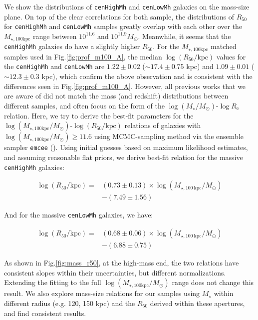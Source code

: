 \documentclass{emulateapj}
\def\rbcg{\texttt{cenHighMh}}
\def\nbcg{\texttt{cenLowMh}}
\def\mstar{{$M_{\star}$}}
\def\logms{{$\log (M_{\star}/M_{\odot})$}}
\def\mtot{{$M_{\star,100\mathrm{kpc}}$}}
\def\logmtot{{$\log (M_{\star,100\mathrm{kpc}}/M_{\odot})$}}
\begin{document}
\begin{CJK*}{UTF8}{gbsn}
    We show the distributions of \rbcg{} and \nbcg{} galaxies on the mass-size plane.  
    On top of the clear correlations for both sample, the distributions of $R_{\mathrm{50}}$ 
    for \rbcg{} and \nbcg{} samples greatly overlap with each other over the \mtot{} range
    between $10^{11.6}$ and $10^{11.9} M_{\odot}$. 
    Meanwhile, it seems that the \rbcg{} galaxies do have a slightly higher 
    $R_{\mathrm{50}}$. 
    For the \mtot{} matched samples used in Fig.\ref{fig:prof_m100_A}, the median 
    $\log (R_{\mathrm{50}}/\mathrm{kpc})$ values for the \rbcg{} and \nbcg{} are 
    $1.22\pm 0.02$ ($\sim 17.4\pm 0.75$ kpc) and $1.09\pm 0.01$ 
    ($\sim 12.3\pm0.3$ kpc), which confirm the above observation and is consistent with 
    the differences seen in Fig.\ref{fig:prof_m100_A}. 
    However, all previous works that we are aware of did not match the mass (and redshift) 
    distributions between different samples, and often focus on the form of the 
    \logms{}-$\log R_{\mathrm{e}}$ relation.  
    Here, we try to derive the best-fit parameters for the 
    \logmtot{}-$\log (R_{\mathrm{50}}/\mathrm{kpc})$ relations of galaxies with 
    \logmtot{}$\geq 11.6$ using MCMC-sampling method via the ensemble sampler 
    \texttt{emcee} (\citealt{Emcee}). 
    Using initial guesses based on maximum likelihood estimates, and assuming reasonable 
    flat priors, we derive best-fit relation for the massive \rbcg{} galaxies:
    
    \begin{equation}
        \begin{aligned}
        \log (R_{\mathrm{50}}/\mathrm{kpc}) = & (0.73\pm0.13) \times \log (M_{\star, 100\ \mathrm{kpc}}/M_{\odot}) \\ & -(7.49\pm1.56)
        \end{aligned}
    \end{equation}

    \noindent And for the massive \nbcg{} galaxies, we have:
    
    \begin{equation}
        \begin{aligned}
        \log (R_{\mathrm{50}}/\mathrm{kpc}) = & (0.68\pm0.06) \times \log (M_{\star, 100\ \mathrm{kpc}}/M_{\odot}) \\ & -(6.88\pm0.75)
        \end{aligned}
    \end{equation}
    
    \noindent As shown in Fig.\ref{fig:mass_r50}, at the high-mass end, the two relations 
    have consistent slopes within their uncertainties, but different normalizations. 
    Extending the fitting to the full \logmtot{} range does not change this result. 
    We also explore mass-size relations for our samples using \mstar{} within different 
    radius (e.g. 120, 150 kpc) and the $R_{\mathrm{50}}$ derived within these apertures, 
    and find consistent results.
    

\end{CJK*}
\end{document}
